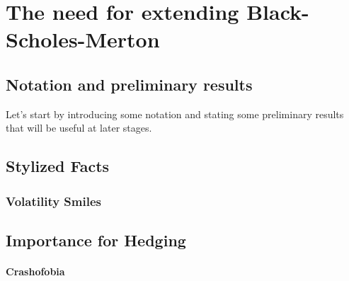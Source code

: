 \chapter{The need for extending Black-Scholes-Merton}

\section{Notation and preliminary results}

Let's start by introducing some notation and stating some preliminary results that will be useful at later stages.

\section{Stylized Facts}

\subsection{Volatility Smiles}

\section{Importance for Hedging}


\subsubsection{Crashofobia}
